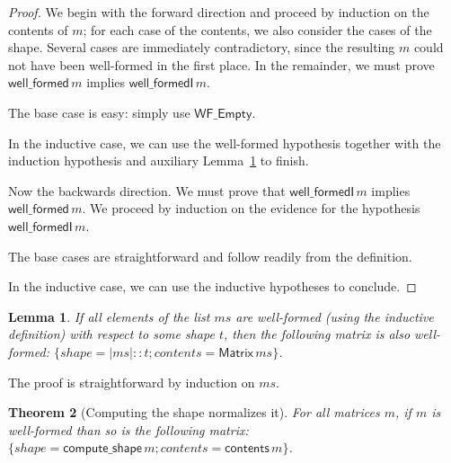 \documentclass[11pt,conference]{IEEEtran}
\newcommand{\var}[1]{\mathit{#1}}
\newcommand{\func}[1]{\mathsf{#1}}
\newcommand{\iname}[1]{\textsf{#1}}
\theoremstyle{plain} %
\newtheorem{thm}{Theorem}[section]
\newtheorem{lem}[thm]{Lemma}
\theoremstyle{definition}
\theoremstyle{remark}
\begin{document}
\begin{proof}
    We begin with the forward direction and proceed by induction on the contents
    of \(m\); for each case of the contents, we also consider the cases of the
    shape. Several cases are immediately contradictory, since the resulting
    \(m\) could not have been well-formed in the first place. In the remainder,
    we must prove \(\func{well\_formed}\, m\) implies \(\func{well\_formedI}\,
    m\).

    The base case is easy: simply use \(\iname{WF\_Empty}\).

    In the inductive case, we can use the well-formed hypothesis together with
    the induction hypothesis and auxiliary Lemma~\ref{Lem:wfI_all_wf_t} to
    finish.

    Now the backwards direction. We must prove that \(\func{well\_formedI}\, m\)
    implies \(\func{well\_formed}\, m\). We proceed by induction on the evidence
    for the hypothesis \(\func{well\_formedI}\, m\).

    The base cases are straightforward and follow readily from the definition.

    In the inductive case, we can use the inductive hypotheses to conclude.
\end{proof}

\begin{lem}\label{Lem:wfI_all_wf_t}
    If all elements of the list \(\var{ms}\) are well-formed (using the inductive
    definition) with respect to some shape \(t\), then the following matrix is
    also well-formed: \(\{ \var{shape} = |\var{ms}| :: t; \var{contents} =
    \func{Matrix}\, \var{ms} \}\).
\end{lem}

The proof is straightforward by induction on \(\var{ms}\).

\begin{thm}[Computing the shape normalizes it]\label{Th:compute_shape_wf_normalizes}
    For all matrices \(m\), if \(m\) is well-formed than so is the following
    matrix: \(\{ \var{shape} = \func{compute\_shape}\, m; \var{contents} =
    \func{contents}\, m \}\).
\end{thm}
\end{document}
